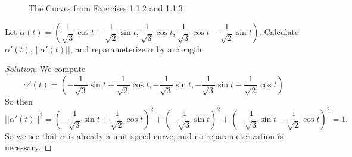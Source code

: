 \documentclass[Shifrin_Solutions_Spring_2018]{subfiles}
\begin{document}
\begin{figure}[h]
\centering
{}
  \caption{The Curves from Exercises 1.1.2 and 1.1.3}
\end{figure}





\begin{exercise} Let
$\alpha (t) = \left( \dfrac{1}{\sqrt{3}} \cos t + \dfrac{1}{\sqrt{2}}\sin t , \dfrac{1}{\sqrt{3}}\cos t , \dfrac{1}{\sqrt{3}}\cos t - \dfrac{1}{\sqrt{2}}\sin t \right)$.
Calculate $\alpha'(t)$, $|| \alpha'(t)||$, and reparameterize $\alpha$ by arclength.
\end{exercise}

\begin{proof}[Solution]
We compute
\[
\alpha'(t) = \left(  -\dfrac{1}{\sqrt{3}}\sin t + \dfrac{1}{\sqrt{2}}\cos t ,
- \dfrac{1}{\sqrt{3}} \sin t ,
-\dfrac{1}{\sqrt{3}}\sin t - \dfrac{1}{\sqrt{2}}\cos t
\right) .
\]
So then
\[
||\alpha'(t)||^2 = \left( -\dfrac{1}{\sqrt{3}}\sin t + \dfrac{1}{\sqrt{2}}\cos t \right)^2 + \left( - \dfrac{1}{\sqrt{3}} \sin t \right)^2 + \left( -\dfrac{1}{\sqrt{3}}\sin t - \dfrac{1}{\sqrt{2}}\cos t \right)^2 = 1 .
\]
So we see that $\alpha$ is already a unit speed curve, and no reparameterization is necessary.
\end{proof}
\end{document}
